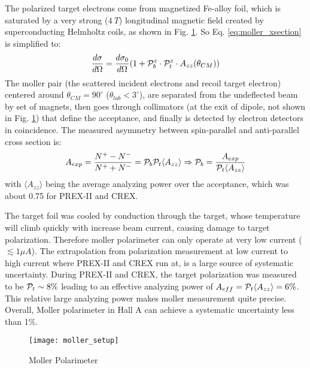 The polarized target electrons come from magnetized Fe-alloy foil, which is 
saturated by a very strong ($4\ T$) longitudinal magnetic field created by 
superconducting Helmholtz coils, as shown in Fig. \ref{fig:moller_polarimeter}. 
So Eq. \ref{eq:moller_xsection} is simplified to:
\begin{equation}
    \frac{d\sigma}{d\Omega} = \frac{d\sigma_0}{d\Omega} ( 1 + \mathcal{P}_b^z \cdot \mathcal{P}_t^z \cdot A_{zz}(\theta_{CM}))
    \label{eq:moller_xsection_1}
\end{equation}
The moller pair (the scattered incident electrons and recoil target electron)
centered around $\theta_{CM} = 90^\circ$ ($\theta_{lab} < 3^\circ$), 
are separated from the undeflected beam by set of magnets, then goes through
collimators (at the exit of dipole, not shown in Fig. \ref{fig:moller_polarimeter}) 
that define the acceptance, and finally is detected by electron detectors in coincidence.
The measured asymmetry between spin-parallel and anti-parallel cross section is:
\begin{equation}
    A_{exp} = \frac{N^+ - N^-}{N^+ + N^-} = \mathcal{P}_b \mathcal{P}_t \langle A_{zz} \rangle 
    \Rightarrow
    \mathcal{P}_b = \frac{A_{exp}}{\mathcal{P}_t \langle A_{zz} \rangle}
\end{equation}
with $\langle A_{zz} \rangle$ being the average analyzing power over the acceptance,
which was about 0.75 for PREX-II and CREX.

The target foil was cooled by conduction through the target, whose temperature 
will climb quickly with increase beam current, causing damage to target
polarization. Therefore moller polarimeter can only operate at very low current ($\lesssim 1\mu A$).
The extrapolation from polarization measurement at low current to high current
where PREX-II and CREX run at, is a large source of systematic uncertainty.
During PREX-II and CREX, the target polarization was measured to be $\mathcal{P}_t \sim 8\%$ 
leading to an effective analyzing power of $A_{eff} = \mathcal{P}_t\langle A_{zz} \rangle = 6\%$.
This relative large analyzing power makes moller measurement quite precise.
Overall, Moller polarimeter in Hall A can achieve a systematic uncertainty less
than 1\%.

\begin{figure}[h!]
    \centering
    \texttt{[image: moller\_setup]}
    \caption{Moller Polarimeter}
    \label{fig:moller_polarimeter}
\end{figure}

